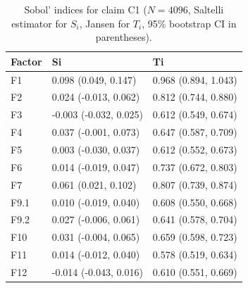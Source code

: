 \begin{table}[ht]
\centering
\caption{Sobol' indices for claim C1 ($N=4096$, Saltelli estimator for $S_i$, Jansen for $T_i$, 95\% bootstrap CI in parentheses).} 
\label{tab:sobol_C1}
\begin{tabular}{lll}
  \hline
Factor & Si & Ti \\ 
  \hline
F1 & 0.098 (0.049, 0.147) & 0.968 (0.894, 1.043) \\ 
  F2 & 0.024 (-0.013, 0.062) & 0.812 (0.744, 0.880) \\ 
  F3 & -0.003 (-0.032, 0.025) & 0.612 (0.549, 0.674) \\ 
  F4 & 0.037 (-0.001, 0.073) & 0.647 (0.587, 0.709) \\ 
  F5 & 0.003 (-0.030, 0.037) & 0.612 (0.552, 0.673) \\ 
  F6 & 0.014 (-0.019, 0.047) & 0.737 (0.672, 0.803) \\ 
  F7 & 0.061 (0.021, 0.102) & 0.807 (0.739, 0.874) \\ 
  F9.1 & 0.010 (-0.019, 0.040) & 0.608 (0.550, 0.668) \\ 
  F9.2 & 0.027 (-0.006, 0.061) & 0.641 (0.578, 0.704) \\ 
  F10 & 0.031 (-0.004, 0.065) & 0.659 (0.598, 0.723) \\ 
  F11 & 0.014 (-0.012, 0.040) & 0.578 (0.519, 0.634) \\ 
  F12 & -0.014 (-0.043, 0.016) & 0.610 (0.551, 0.669) \\ 
   \hline
\end{tabular}
\end{table}
